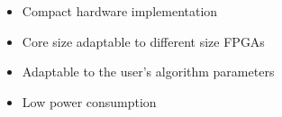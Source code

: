 \begin{itemize}
\item Compact hardware implementation
\item Core size adaptable to different size FPGAs
\item Adaptable to the user's algorithm parameters
\item Low power consumption
\end{itemize}
